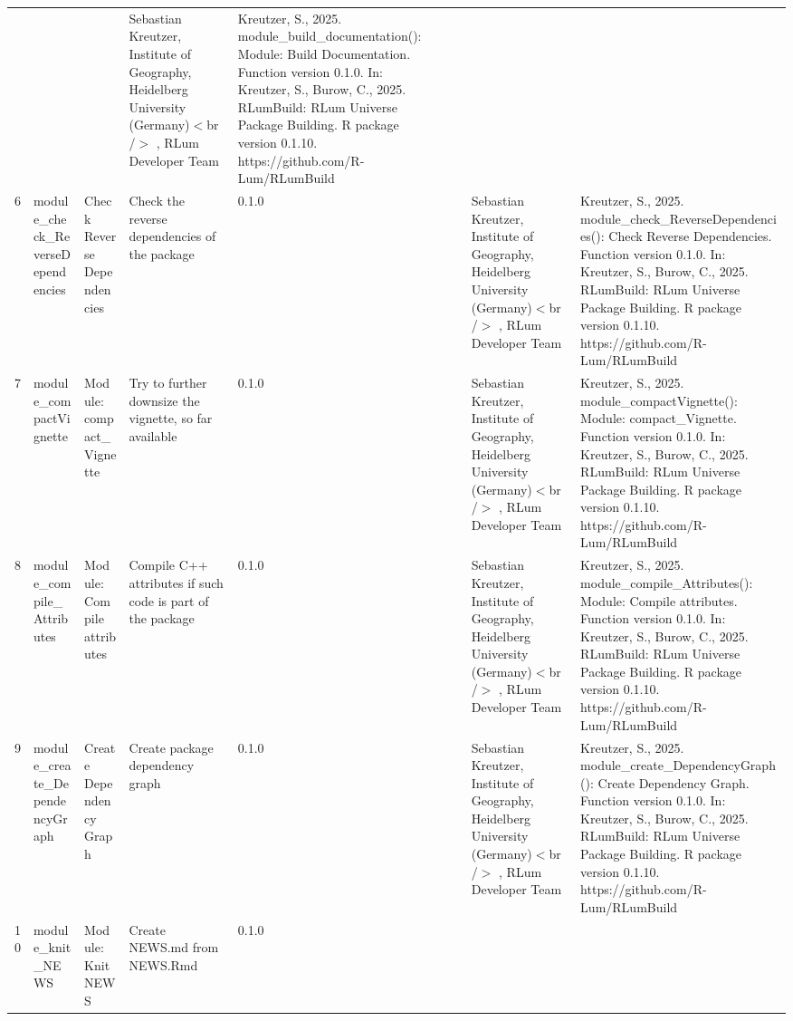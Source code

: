 \begin{table}[ht]
\begin{tabular}{rllllllll}
 &  &  & Sebastian Kreutzer, Institute of Geography, Heidelberg University (Germany)$<$br /$>$ , RLum Developer Team & Kreutzer, S., 2025. module\_build\_documentation(): Module: Build Documentation. Function version 0.1.0. In: Kreutzer, S., Burow, C., 2025. RLumBuild: RLum Universe Package Building. R package version 0.1.10. https://github.com/R-Lum/RLumBuild
 \\ 
  6 & module\_check\_ReverseDependencies & Check Reverse Dependencies & Check the reverse dependencies of the package & 0.1.0
 &  &  & Sebastian Kreutzer, Institute of Geography, Heidelberg University (Germany)$<$br /$>$ , RLum Developer Team & Kreutzer, S., 2025. module\_check\_ReverseDependencies(): Check Reverse Dependencies. Function version 0.1.0. In: Kreutzer, S., Burow, C., 2025. RLumBuild: RLum Universe Package Building. R package version 0.1.10. https://github.com/R-Lum/RLumBuild
 \\ 
  7 & module\_compactVignette & Module: compact\_Vignette & Try to further downsize the vignette, so far available & 0.1.0
 &  &  & Sebastian Kreutzer, Institute of Geography, Heidelberg University (Germany)$<$br /$>$ , RLum Developer Team & Kreutzer, S., 2025. module\_compactVignette(): Module: compact\_Vignette. Function version 0.1.0. In: Kreutzer, S., Burow, C., 2025. RLumBuild: RLum Universe Package Building. R package version 0.1.10. https://github.com/R-Lum/RLumBuild
 \\ 
  8 & module\_compile\_Attributes & Module: Compile attributes & Compile C++ attributes if such code is part of the package & 0.1.0
 &  &  & Sebastian Kreutzer, Institute of Geography, Heidelberg University (Germany)$<$br /$>$ , RLum Developer Team & Kreutzer, S., 2025. module\_compile\_Attributes(): Module: Compile attributes. Function version 0.1.0. In: Kreutzer, S., Burow, C., 2025. RLumBuild: RLum Universe Package Building. R package version 0.1.10. https://github.com/R-Lum/RLumBuild
 \\ 
  9 & module\_create\_DependencyGraph & Create Dependency Graph & Create package dependency graph & 0.1.0
 &  &  & Sebastian Kreutzer, Institute of Geography, Heidelberg University (Germany)$<$br /$>$ , RLum Developer Team & Kreutzer, S., 2025. module\_create\_DependencyGraph(): Create Dependency Graph. Function version 0.1.0. In: Kreutzer, S., Burow, C., 2025. RLumBuild: RLum Universe Package Building. R package version 0.1.10. https://github.com/R-Lum/RLumBuild
 \\ 
  10 & module\_knit\_NEWS & Module: Knit NEWS & Create NEWS.md from NEWS.Rmd & 0.1.0

\end{tabular}
\end{table}
